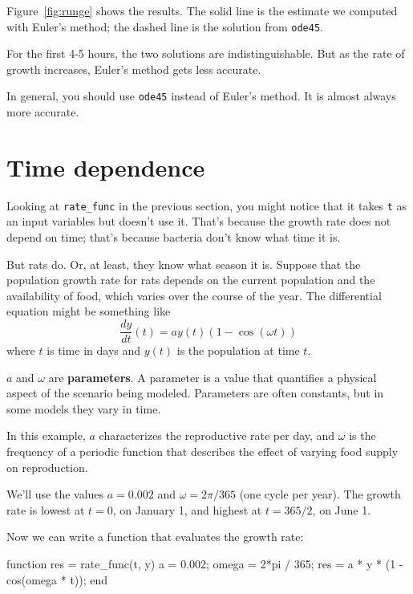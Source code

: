 \documentclass[main.tex]{subfiles}
\begin{document}
Figure~\ref{fig:runge} shows the results.  The solid line is the estimate we computed with Euler's method; the dashed line is the solution from {\tt ode45}.

For the first 4-5 hours, the two solutions are indistinguishable.  But as the rate of growth increases, Euler's method gets less accurate.

In general, you should use {\tt ode45} instead of Euler's method.  It is almost always more accurate.  


\section{Time dependence}

Looking at \verb"rate_func" in the previous section, you might notice that it takes {\tt t} as an input variables but doesn't use it.  That's because the growth rate does not depend on time; that's because bacteria don't know what time it is.


But rats do.  Or, at least, they know what season it is.
Suppose that the population growth rate for rats
depends on the current population and the availability of food,
which varies over the course of the year.
The differential equation might be something like
%
\begin{equation}
\frac{dy}{dt}(t) = a y(t) \left(1 - \cos (\omega t) \right)
\end{equation}
%
where $t$ is time in days and $y(t)$ is the population at time $t$.

$a$ and $\omega$ are {\bf parameters}.  A parameter is a value that
quantifies a physical aspect of the scenario being modeled.  Parameters are often constants, but in some models they vary in time.


In this example, $a$ characterizes the reproductive rate per day, and
$\omega$ is the frequency of a periodic function that describes
the effect of varying food supply on reproduction.

We'll use the values $a = 0.002$
and $\omega = 2 \pi/365$ (one cycle per year).
The growth rate is lowest at $t=0$, on January 1, and highest at $t=365/2$, on June 1.

Now we can write a function that evaluates the growth rate:

\begin{code}
function res = rate_func(t, y)
    a = 0.002;
    omega = 2*pi / 365;
    res = a * y * (1 - cos(omega * t));
end
\end{code}
\end{document}

